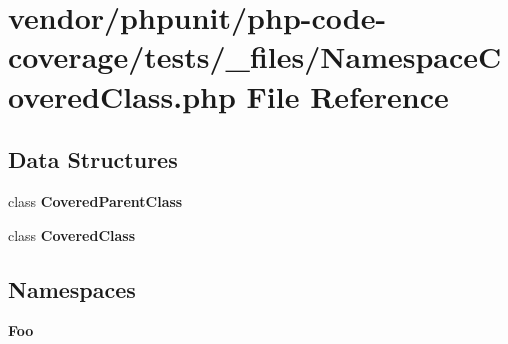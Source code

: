 \section{vendor/phpunit/php-\/code-\/coverage/tests/\+\_\+files/\+Namespace\+Covered\+Class.php File Reference}
\label{php-code-coverage_2tests_2__files_2_namespace_covered_class_8php}
\subsection*{Data Structures}
\begin{DoxyCompactItemize}
\item 
class {\bf Covered\+Parent\+Class}
\item 
class {\bf Covered\+Class}
\end{DoxyCompactItemize}
\subsection*{Namespaces}
\begin{DoxyCompactItemize}
\item 
 {\bf Foo}
\end{DoxyCompactItemize}
